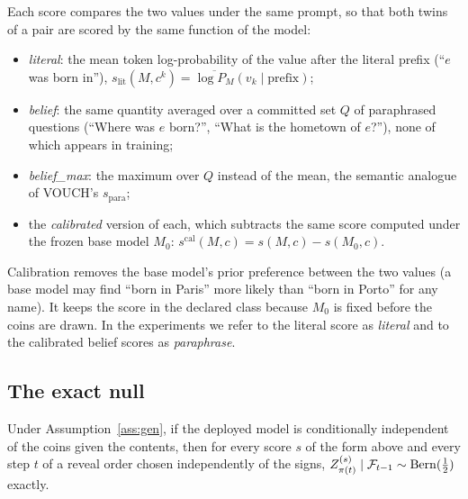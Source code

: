 Each score compares the two values under the same prompt, so that both twins of a pair
are scored by the same function of the model:
\begin{itemize}
\item \emph{literal}: the mean token log-probability of the value after the literal
prefix (``$e$ was born in''), $s_{\mathrm{lit}}(M,c^k)=\overline{\log P_M}(v_k\mid
\text{prefix})$;
\item \emph{belief}: the same quantity averaged over a committed set $Q$ of paraphrased
questions (``Where was $e$ born?'', ``What is the hometown of $e$?''), none of which
appears in training;
\item \emph{belief\_max}: the maximum over $Q$ instead of the mean, the semantic
analogue of VOUCH's $s_{\mathrm{para}}$;
\item the \emph{calibrated} version of each, which subtracts the same score computed
under the frozen base model $M_0$: $s^{\mathrm{cal}}(M,c)=s(M,c)-s(M_0,c)$.
\end{itemize}
Calibration removes the base model's prior preference between the two values (a base
model may find ``born in Paris'' more likely than ``born in Porto'' for any name). It
keeps the score in the declared class because $M_0$ is fixed before the coins are drawn.
In the experiments we refer to the literal score as \emph{literal} and to the calibrated
belief scores as \emph{paraphrase}.

\subsection{The exact null}

\begin{proposition}\label{prop:semantic}
Under Assumption~\ref{ass:gen}, if the deployed model is conditionally independent of
the coins given the contents, then for every score $s$ of the form above and every step
$t$ of a reveal order chosen independently of the signs,
$Z_{\pi(t)}^{(s)}\mid\mathcal{F}_{t-1}\sim\mathrm{Bern}(\frac12)$ exactly.
\end{proposition}

